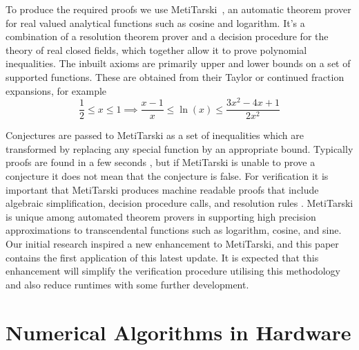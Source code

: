 To produce the required proofs we use MetiTarski~\cite{akbarpour2010metitarski}, an automatic theorem prover for real valued analytical functions such as cosine and logarithm. It's a combination of a resolution theorem prover and a decision procedure for the theory of real closed fields, which together allow it to prove polynomial inequalities. The inbuilt axioms are primarily upper and lower bounds on a set of supported functions. These are obtained from their Taylor or continued fraction expansions, for example
$$\frac{1}{2} \leq x \leq 1 \implies \frac{x-1}{x} \leq \ln(x) \leq \frac{3x^2-4x+1}{2x^2}$$\newline

Conjectures are passed to MetiTarski as a set of inequalities which are transformed by replacing any special function by an appropriate bound. Typically proofs are found in a few seconds \cite{akbarpour2009applications}, but if MetiTarski is unable to prove a conjecture it does not mean that the conjecture is false. For verification it is important that MetiTarski produces machine readable proofs that include algebraic simplification, decision procedure calls, and resolution rules \cite{denman2009formal}. MetiTarski is unique among automated theorem provers in supporting high precision approximations to transcendental functions such as logarithm, cosine, and sine. Our initial research inspired a new enhancement to MetiTarski, and this paper contains the first application of this latest update. It is expected that this enhancement will simplify the verification procedure utilising this methodology and also reduce runtimes with some further development. 


\section{Numerical Algorithms in Hardware}
\label{Num algos}

